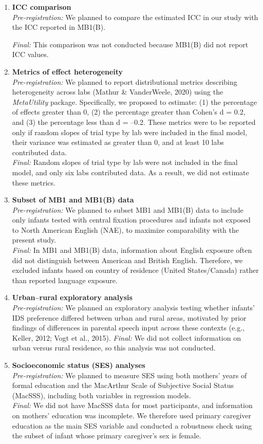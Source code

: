 \documentclass[
  ,man,floatsintext]{apa6}
\begin{document}
\begin{enumerate}
\def\labelenumi{\arabic{enumi}.}
\item
  \textbf{ICC comparison}\\
  \emph{Pre-registration:} We planned to compare the estimated ICC in our study with the ICC reported in MB1(B).

  \emph{Final:} This comparison was not conducted because MB1(B) did not report ICC values.
\item
  \textbf{Metrics of effect heterogeneity}\\
  \emph{Pre-registration:} We planned to report distributional metrics describing heterogeneity across labs (Mathur \& VanderWeele, 2020) using the \emph{MetaUtility} package. Specifically, we proposed to estimate: (1) the percentage of effects greater than 0, (2) the percentage greater than Cohen's d = 0.2, and (3) the percentage less than d = --0.2. These metrics were to be reported only if random slopes of trial type by lab were included in the final model, their variance was estimated as greater than 0, and at least 10 labs contributed data.\\
  \emph{Final:} Random slopes of trial type by lab were not included in the final model, and only six labs contributed data. As a result, we did not estimate these metrics.
\item
  \textbf{Subset of MB1 and MB1(B) data}\\
  \emph{Pre-registration:} We planned to subset MB1 and MB1(B) data to include only infants tested with central fixation procedures and infants not exposed to North American English (NAE), to maximize comparability with the present study.\\
  \emph{Final:} In MB1 and MB1(B) data, information about English exposure often did not distinguish between American and British English. Therefore, we excluded infants based on country of residence (United States/Canada) rather than reported language exposure.
\item
  \textbf{Urban--rural exploratory analysis}\\
  \emph{Pre-registration:} We planned an exploratory analysis testing whether infants' IDS preference differed between urban and rural areas, motivated by prior findings of differences in parental speech input across these contexts (e.g., Keller, 2012; Vogt et al., 2015).
  \emph{Final:} We did not collect information on urban versus rural residence, so this analysis was not conducted.
\item
  \textbf{Socioeconomic status (SES) analyses}\\
  \emph{Pre-registration:} We planned to measure SES using both mothers' years of formal education and the MacArthur Scale of Subjective Social Status (MacSSS), including both variables in regression models.\\
  \emph{Final:} We did not have MacSSS data for most participants, and information on mothers' education was incomplete. We therefore used primary caregiver education as the main SES variable and conducted a robustness check using the subset of infant whose primary caregiver's sex is female.
\end{enumerate}
\end{document}
